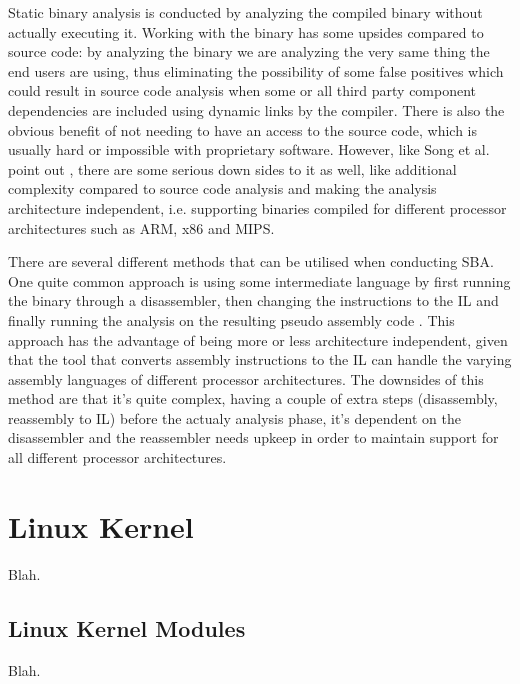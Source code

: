 Static binary analysis is conducted by analyzing the compiled binary without actually executing it.
Working with the binary has some upsides compared to source code: by analyzing the binary we are
analyzing the very same thing the end users are using, thus eliminating the possibility of some
false positives which could result in source code analysis when some or all third party component
dependencies are included using dynamic links by the compiler. There is also the obvious benefit of
not needing to have an access to the source code, which is usually hard or impossible with
proprietary software. However, like Song et al. point out \cite{song2008bitblaze}, there are some
serious down sides to it as well, like additional complexity compared to source code analysis and
making the analysis architecture independent, i.e. supporting binaries compiled for different
processor architectures such as ARM, x86 and MIPS.

There are several different methods that can be utilised when conducting SBA. One quite common
approach is using some intermediate language by first running the binary through a disassembler,
then changing the instructions to the IL and finally running the analysis on the resulting pseudo
assembly code \cite{song2008bitblaze, brumley2011bap}. This approach has the advantage of being
more or less architecture independent, given that the tool that converts assembly instructions to
the IL can handle the varying assembly languages of different processor architectures. The
downsides of this method are that it's quite complex, having a couple of extra steps (disassembly,
reassembly to IL) before the actualy analysis phase, it's dependent on the disassembler and the
reassembler needs upkeep in order to maintain support for all different processor architectures.

\section{Linux Kernel}

Blah.

\subsection{Linux Kernel Modules}

Blah.
